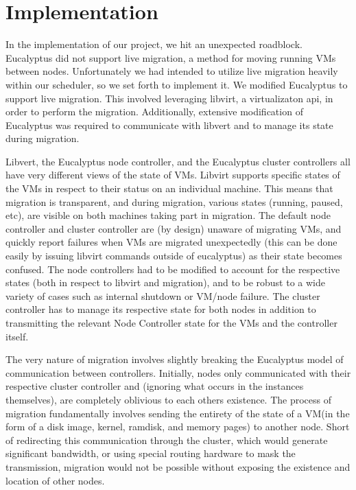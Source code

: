 \section{Implementation}

In the implementation of our project, we hit an unexpected roadblock.  Eucalyptus did not support live migration, a method for moving running VMs between nodes.  Unfortunately we had intended to utilize live migration heavily within our scheduler, so we set forth to implement it.  We modified Eucalyptus to support live migration.  This involved leveraging libvirt, a virtualizaton api, in order to perform the migration.  Additionally, extensive modification of Eucalyptus was required to communicate with libvert and to manage its state during migration.  

Libvert, the Eucalyptus node controller, and the Eucalyptus cluster controllers all have very different views of the state of VMs.  Libvirt supports specific states of the VMs in respect to their status on an individual machine. This means that migration is transparent, and during migration, various states (running, paused, etc), are visible on both machines taking part in migration.  The default node controller and cluster controller are (by design) unaware of migrating VMs, and quickly report failures when VMs are migrated unexpectedly (this can be done easily by issuing libvirt commands outside of eucalyptus) as their state becomes confused.  The node controllers had to be modified to account for the respective states (both in respect to libvirt and migration), and to be robust to a wide variety of cases such as internal shutdown or VM/node failure.  The cluster controller has to manage its respective state for both nodes in addition to transmitting the relevant Node Controller state for the VMs and the controller itself.  

The very nature of migration involves slightly breaking the Eucalyptus model of communication between controllers.  Initially, nodes only communicated with their respective cluster controller and (ignoring what occurs in the instances themselves), are completely oblivious to each others existence.  The process of migration fundamentally involves sending the entirety of the state of a VM(in the form of a disk image, kernel, ramdisk, and memory pages) to another node.  Short of redirecting this communication through the cluster, which would generate significant bandwidth, or using special routing hardware to mask the transmission, migration would not be possible without exposing the existence and location of other nodes.

